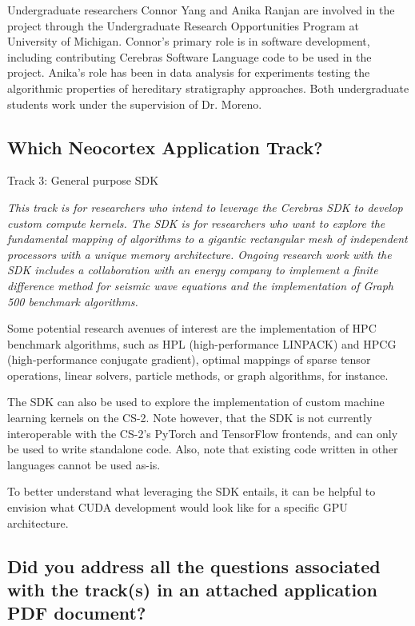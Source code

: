 Undergraduate researchers Connor Yang and Anika Ranjan are involved in the project through the Undergraduate Research Opportunities Program at University of Michigan.
Connor's primary role is in software development, including contributing Cerebras Software Language code to be used in the project.
Anika's role has been in data analysis for experiments testing the algorithmic properties of hereditary stratigraphy approaches.
Both undergraduate students work under the supervision of Dr. Moreno.

\subsection{Which Neocortex Application Track?}

Track 3: General purpose SDK

\begin{displayquote} \itshape
This track is for researchers who intend to leverage the Cerebras SDK to develop custom compute kernels.
The SDK is for researchers who want to explore the fundamental mapping of algorithms to a gigantic rectangular mesh of independent processors with a unique memory architecture.
Ongoing research work with the SDK includes a collaboration with an energy company to implement a finite difference method for seismic wave equations and the implementation of Graph 500 benchmark algorithms.

Some potential research avenues of interest are the implementation of HPC benchmark algorithms, such as HPL (high-performance LINPACK) and HPCG (high-performance conjugate gradient), optimal mappings of sparse tensor operations, linear solvers, particle methods, or graph algorithms, for instance.

The SDK can also be used to explore the implementation of custom machine learning kernels on the CS-2.
Note however, that the SDK is not currently interoperable with the CS-2's PyTorch and TensorFlow frontends, and can only be used to write standalone code.
Also, note that existing code written in other languages cannot be used as-is.

To better understand what leveraging the SDK entails, it can be helpful to envision what CUDA development would look like for a specific GPU architecture.
\end{displayquote}

\subsection{Did you address all the questions associated with the track(s) in an attached application PDF document?}

